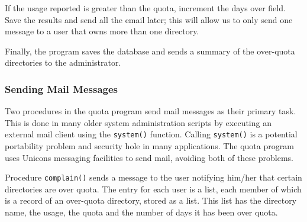 If the usage reported is greater than the quota, increment the
{\textquotedbl}days over{\textquotedbl} field. Save the results and
send all the email later; this will allow us to only send one message
to a user that owns more than one directory. 


Finally, the program saves the database and sends a summary of the
over-quota directories to the administrator. 


\subsubsection{Sending Mail Messages}

Two procedures in the quota program send mail messages as their primary
task. This is done in many older system administration scripts by
executing an external mail client using the \texttt{system()} function.
Calling \texttt{system()} is a potential portability
problem and security hole in many applications. The quota program uses
Unicon{\textquotesingle}s messaging facilities to send mail, avoiding
both of these problems.

Procedure \texttt{complain()} sends a message to the user notifying
him/her that certain directories are over quota. The entry for each
user is a list, each member of which is a record of an over-quota
directory, stored as a list. This list has the directory name, the
usage, the quota and the number of days it has been over quota.

